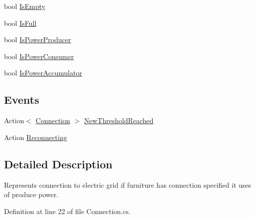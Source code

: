 \begin{DoxyCompactItemize}
bool \hyperlink{class_project_porcupine_1_1_power_network_1_1_connection_a9737ff8f986dcc0fe5024f67f2480a9d}{Is\+Empty}
\item 
bool \hyperlink{class_project_porcupine_1_1_power_network_1_1_connection_a091f2e21670d40da2ea9ec6a5bebb14a}{Is\+Full}
\item 
bool \hyperlink{class_project_porcupine_1_1_power_network_1_1_connection_a8e1c69413d62941c0e2a4fdfb7c723e9}{Is\+Power\+Producer}
\item 
bool \hyperlink{class_project_porcupine_1_1_power_network_1_1_connection_aefd8b6bf19a51d5473d823efa6554b90}{Is\+Power\+Consumer}
\item 
bool \hyperlink{class_project_porcupine_1_1_power_network_1_1_connection_a68feabe639d89f15ac88faed4bb61c2c}{Is\+Power\+Accumulator}
\end{DoxyCompactItemize}
\subsection*{Events}
\begin{DoxyCompactItemize}
\item 
Action$<$ \hyperlink{class_project_porcupine_1_1_power_network_1_1_connection}{Connection} $>$ \hyperlink{class_project_porcupine_1_1_power_network_1_1_connection_acde68b5f3865d31e1ecb66a49edab51a}{New\+Threshold\+Reached}
\item 
Action \hyperlink{class_project_porcupine_1_1_power_network_1_1_connection_a71ac81543bd631d64e28455bf799599d}{Reconnecting}
\end{DoxyCompactItemize}


\subsection{Detailed Description}
Represents connection to electric grid if furniture has connection specified it uses of produce power. 



Definition at line 22 of file Connection.\+cs.




